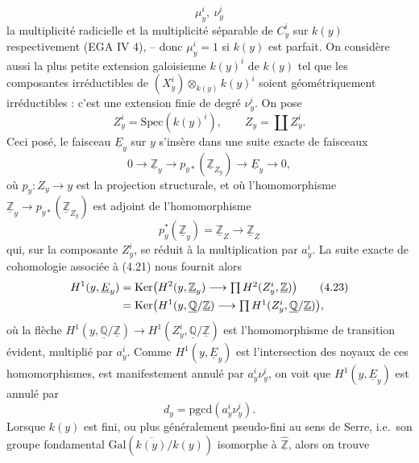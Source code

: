 \documentclass[11pt,a4paper]{article}
\begin{document}
\[
\mu_{y}^{i} , \ \nu_{y}^{i}
\tag{4.19}
\]
la multiplicité radicielle et la multiplicité séparable de $C_{y}^{i}$ sur
$k(y)$ respectivement (EGA IV 4), -- donc $\mu_{y}^{i} = 1$ si
$k(y)$ est parfait. On  considère aussi la plus petite
extension galoisienne $k(y)^{i}$  de $k(y)$ tel que
les composantes irréductibles de $(X_{y}^{i}) \otimes_{k(y)} k(y)^{i}$ soient
géométriquement irréductibles : c'est une extension finie 
de degré $\nu_{y}^{i}$. On pose
\[
Z_{y}^{i} = \mathrm{Spec}(k(y)^{i}) , \qquad Z_{y} = \coprod Z_{y}^{i} .
\tag{4.20}
\]
Ceci posé, le faisceau $\underline{E}_{y}$ sur $y$ s'insère dans une suite
exacte de faisceaux
\[
0 \to \underline{\mathbb{Z}}_{y} \longrightarrow
p_{y*}(\underline{\mathbb{Z}}_{Z_{y}}) \longrightarrow \underline{E}_{y}
\longrightarrow 0 ,
\tag{4.21}
\]
où $p_{y} : Z_{y} \to y$ est la projection structurale, et où
l'homomorphisme $\underline{\mathbb{Z}}_{y} \to
p_{y*}(\underline{\mathbb{Z}}_{Z_{y}})$ est adjoint de l'homomorphisme
\[
p_{y}^{*}(\underline{\mathbb{Z}}_{y}) = \underline{\mathbb{Z}}_{Z}
\longrightarrow \underline{\mathbb{Z}}_{Z}
\tag{4.22}
\]
qui, sur la composante $Z_{y}^{i}$, se réduit à la multiplication par
$a_{y}^{i}$. La suite exacte de cohomologie associée à (4.21) nous fournit
alors
\begin{align}
H^{1}(y,\underline{E}_{y}) &= \mathrm{Ker}\bigl(H^{2}(y,\underline{\mathbb{Z}}_{y})
\longrightarrow \textstyle\prod H^{2}(Z_{y}^{i},\underline{\mathbb{Z}})\bigr)
\tag{4.23} \\
&= \mathrm{Ker}\bigl(H^{1}(y,\underline{\mathbb{Q}}/\underline{\mathbb{Z}})
\longrightarrow \textstyle\prod H^{1}(Z_{y}^{i},\underline{\mathbb{Q}}/
\underline{\mathbb{Z}})\bigr) , \notag
\end{align}
où la flèche $H^{1}(y,\underline{\mathbb{Q}}/\underline{\mathbb{Z}}) \to
H^{1}(Z_{y}^{i},\underline{\mathbb{Q}}/\underline{\mathbb{Z}})$ est
l'homomorphisme de transition évident, multiplié par $a_{y}^{i}$. Comme
$H^{1}(y,\underline{E}_{y})$ est l'intersection des noyaux de ces
homomorphismes, \struck{\ill{}}  est manifestement
annulé par $a_{y}^{i}\nu_{y}^{i}$, on voit que $H^{1}(y,\underline{E}_{y})$
est annulé par
\[
d_{y} = \mathrm{pgcd}(a_{y}^{i}\nu_{y}^{i}) .
\tag{4.24}
\]
Lorsque $k(y)$ est fini, ou plus généralement pseudo-fini au sens de Serre,
i.e.\ son groupe fondamental $\mathrm{Gal}(\overline{k(y)}/k(y))$ isomorphe
à $\hat{\underline{\mathbb{Z}}}$, alors on trouve
\end{document}

